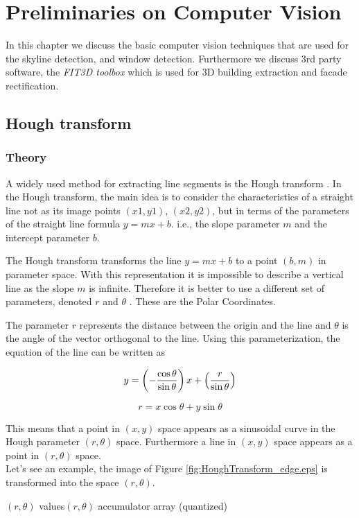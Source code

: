 \section{Preliminaries on Computer Vision}
\label{sec:ch2}
In this chapter we discuss the basic computer vision techniques that are used for
the skyline detection, and window detection.  Furthermore we discuss 3rd
party software, the \emph{FIT3D toolbox} \cite{FIT3D} which is used for 3D building extraction and facade rectification.

\subsection{Hough transform}
\label{sec:prelimHough}
\subsubsection{Theory}
	A widely used method for extracting line segments is the Hough transform
	\cite{Hough}.
	In the Hough transform, the main idea is to consider the characteristics of a
	straight line not as its image points $(x1, y1)$, $(x2, y2)$, but in
	terms of the parameters of the straight line formula $y = mx + b$. i.e., the
	slope parameter $m$ and the intercept parameter $b$.


	The Hough transform transforms the line $y = mx + b$ 
	to a point $(b,m)$ in parameter space.
	With this representation it is impossible to describe a vertical line as 
	the slope $m$ is infinite.
	Therefore it is better to use a different set of parameters, denoted $r$ and $\theta$ .  These are the Polar Coordinates.

	The parameter $r$ represents the distance between the origin and the line  and $\theta$ is the angle of the vector orthogonal to the line.
	Using this parameterization, the equation of the line can be written as

\[	    y = \left(-{\cos\theta\over\sin\theta}\right)x + \left({r\over{\sin\theta}}\right) \]

	\[r = x \cos \theta+y\sin \theta \]
	
	This means that a point in $(x,y)$ space appears as a sinusoidal
	curve in the Hough parameter $(r,\theta)$ space.  Furthermore a line in
	$(x,y)$ space appears as a point in $(r,\theta)$ space.\\
	Let's see an example, the image of Figure \ref{fig:HoughTransform_edge.eps} 
	is transformed into the space $(r,\theta)$.
	
	 {$(r, \theta)$ values}{$(r, \theta)$ accumulator array (quantized)}
	\clearpage

